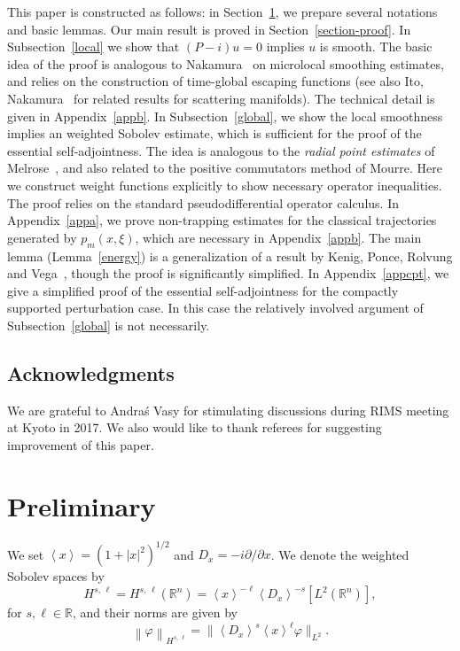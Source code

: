 \documentclass[10pt]{amsart}
\theoremstyle{definition}
\newcommand*\f{\varphi}
\newcommand*\x{\xi}
\newcommand*\re{\mathbb{R}}
\newcommand*\pa{\partial}
\newcommand{\jap}[1]{\left\langle #1 \right\rangle}
\newcommand{\norm}[1]{\left\| #1 \right\|}
\newcommand{\bignorm}[1]{\bigl\| #1 \bigr\|}
\begin{document}
This paper is constructed as follows: in Section~\ref{pre}, we prepare several notations and basic lemmas. Our main result is proved in Section~\ref{section-proof}. In Subsection~\ref{local} we show that $(P-i)u=0$ implies $u$ is smooth. The basic idea of the proof is analogous to Nakamura~\cite{N} on microlocal smoothing estimates, and relies on the construction of time-global escaping functions (see also Ito, Nakamura~\cite{IN} for related results for scattering manifolds). The technical detail is given in Appendix~\ref{appb}. In Subsection~\ref{global}, we show the local smoothness implies an weighted Sobolev estimate, which is sufficient for the proof of the essential self-adjointness. The idea is analogous to the {\em radial point estimates}\/ of Melrose~\cite{M}, and also related to the positive commutators method of Mourre. Here we construct weight functions explicitly to show necessary operator inequalities. The proof relies on the standard pseudodifferential operator calculus. In Appendix~\ref{appa}, we prove non-trapping estimates for the classical trajectories generated by $p_m(x,\x)$, which are necessary in Appendix~\ref{appb}. The main lemma (Lemma~\ref{energy}) is a generalization of a result by Kenig, Ponce, Rolvung and Vega~\cite{KPRV}, though the proof is significantly simplified. In Appendix~\ref{appcpt}, we give a simplified proof of the essential self-adjointness for the compactly supported perturbation case. In this case the relatively involved argument of Subsection~\ref{global} is not necessarily.
%

\subsection*{Acknowledgments}
We are grateful to Andra\'s Vasy for stimulating discussions during RIMS meeting at Kyoto in 2017. We also would like to thank referees for suggesting improvement of this paper.



\section{Preliminary}\label{pre}
We set $\jap{x}=(1+|x|^2)^{1/2}$ and $D_x=-i\pa/\pa x$. We denote the weighted Sobolev spaces by
\[
H^{s,\,\ell} = H^{s,\,\ell}(\re^n) = \jap{x}^{-\ell}\jap{D_x}^{-s}\left[L^2(\re^n)\right],
\]
for $s,\ell\in\re$, and their norms are given by
\[
\norm{\f}_{H^{s,\,\ell}} = \bignorm{\jap{D_x}^s \jap{x}^\ell \f}_{L^2}.
\]
\end{document}
